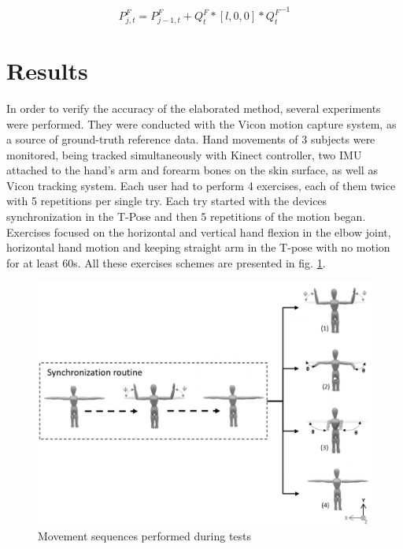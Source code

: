 \documentclass[sensors,article,submit,moreauthors,pdftex,10pt,a4paper]{mdpi}
\begin{document}
	\begin{equation} 	
		P_{j,t}^F=P_{j-1,t}^F+Q_t^F*[l,0,0]*{Q_t^F}^{-1}     
		\label{eq:hybrid:positionCalculationForm}              	
	\end{equation}
		
	\section{Results}
		
		
	In order to verify the accuracy of the elaborated method, several experiments were performed. They were conducted with the Vicon motion capture system, as a source of ground-truth reference data. Hand movements of 3 subjects were monitored, being tracked simultaneously with Kinect controller, two IMU attached to the hand's arm and forearm bones on the skin surface, as well as Vicon tracking system. Each user had to perform 4 exercises, each of them twice with 5 repetitions per single try. Each try started with the devices synchronization in the T-Pose and then 5 repetitions of the motion began. Exercises focused on the horizontal and vertical hand flexion in the elbow joint, horizontal hand motion and keeping straight arm in the T-pose with no motion for at least 60s. All these exercises schemes are presented in fig. \ref{fig:results:sequences}.
		
	\begin{figure}[H]
		\centering
		\includegraphics[width=12cm]{Figure8.png}
		\caption{Movement sequences performed during tests}
		\label{fig:results:sequences}
	\end{figure}
		
\end{document}
